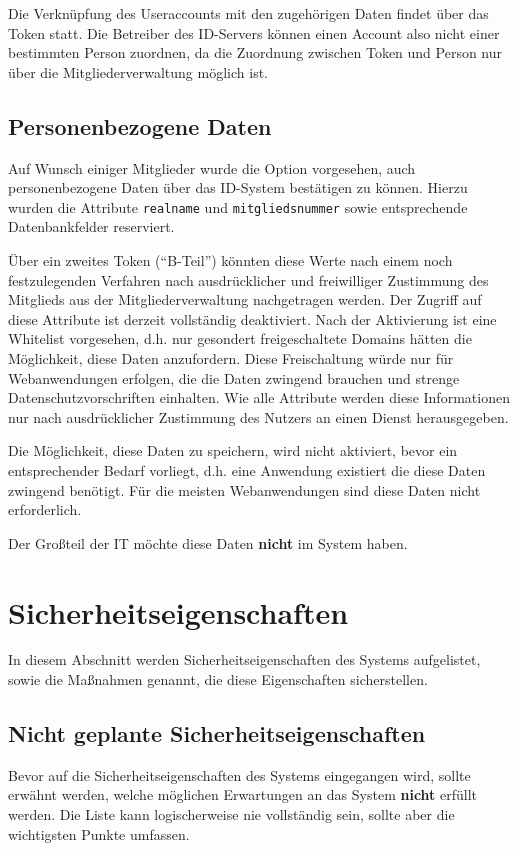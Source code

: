 \documentclass[parskip=half]{scrartcl}
\begin{document}
Die Verknüpfung des Useraccounts mit den zugehörigen Daten findet über das Token statt.
Die Betreiber des ID-Servers können einen Account also nicht einer bestimmten Person zuordnen,
da die Zuordnung zwischen Token und Person nur über die Mitgliederverwaltung möglich ist.

\subsection{Personenbezogene Daten}
Auf Wunsch einiger Mitglieder wurde die Option vorgesehen, auch personenbezogene Daten über das ID-System bestätigen zu können.
Hierzu wurden die Attribute \texttt{realname} und \texttt{mitgliedsnummer} sowie entsprechende Datenbankfelder reserviert.

Über ein zweites Token ("`B-Teil"') könnten diese Werte nach einem noch festzulegenden Verfahren
nach ausdrücklicher und freiwilliger Zustimmung des Mitglieds aus der Mitgliederverwaltung nachgetragen werden.
Der Zugriff auf diese Attribute ist derzeit vollständig deaktiviert.
Nach der Aktivierung ist eine Whitelist vorgesehen, d.h. nur gesondert freigeschaltete Domains hätten die Möglichkeit, diese Daten anzufordern.
Diese Freischaltung würde nur für Webanwendungen erfolgen, die die Daten zwingend brauchen und strenge Datenschutzvorschriften einhalten.
Wie alle Attribute werden diese Informationen nur nach ausdrücklicher Zustimmung des Nutzers an einen Dienst herausgegeben.

Die Möglichkeit, diese Daten zu speichern, wird nicht aktiviert, bevor ein entsprechender Bedarf vorliegt, d.h. eine Anwendung existiert die diese Daten zwingend benötigt.
Für die meisten Webanwendungen sind diese Daten nicht erforderlich.

Der Großteil der IT möchte diese Daten \textbf{nicht} im System haben.


\section{Sicherheitseigenschaften}
In diesem Abschnitt werden Sicherheitseigenschaften des Systems aufgelistet, sowie die Maßnahmen genannt, die diese Eigenschaften sicherstellen.

\subsection{Nicht geplante Sicherheitseigenschaften}
Bevor auf die Sicherheitseigenschaften des Systems eingegangen wird, sollte erwähnt werden, welche möglichen Erwartungen an das System \textbf{nicht} erfüllt werden.
Die Liste kann logischerweise nie vollständig sein, sollte aber die wichtigsten Punkte umfassen.
\end{document}
